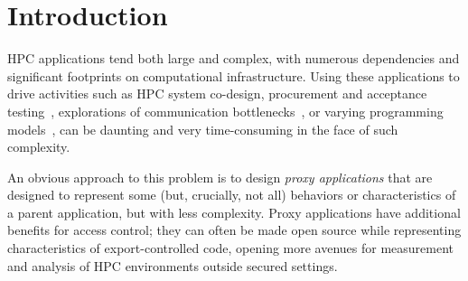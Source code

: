\section{Introduction}
\label{sec:intro}
HPC applications tend both large and complex, with numerous dependencies and significant footprints on computational infrastructure.
Using these applications to drive activities such as HPC system co-design, procurement and acceptance testing~\cite{larrea2020towards}, explorations of communication bottlenecks~\cite{aaziz2019fine}, or varying programming models~\cite{hochstein2005parallel}, can be daunting and very time-consuming in the face of such complexity.

An obvious approach to this problem is to design \emph{proxy applications} that are designed to represent some (but, crucially, not all) behaviors or characteristics of a parent application, but with less complexity.  Proxy applications have additional benefits for access control; they can often be made open source while representing characteristics of export-controlled code, opening more avenues for measurement and analysis of HPC environments outside secured settings.
%


